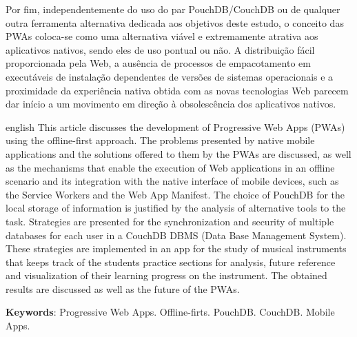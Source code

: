 \documentclass[
	article,			%
	12pt,				%
	oneside,			%
	a4paper,			%
	english,			%
	brazil,				%
	sumario=tradicional
	]{abntex2}
\begin{document}
Por fim, independentemente do uso do par PouchDB/CouchDB ou de qualquer outra ferramenta alternativa dedicada aos objetivos deste estudo, o conceito das PWAs coloca-se como uma alternativa viável e extremamente atrativa aos aplicativos nativos, sendo eles de uso pontual ou não. A distribuição fácil proporcionada pela Web, a ausência de processos de empacotamento em executáveis de instalação dependentes de versões de sistemas operacionais e a proximidade da experiência nativa obtida com as novas tecnologias Web parecem dar início a um movimento em direção à obsolescência dos aplicativos nativos.

\postextual



\emptythanks
\maketitle

\renewcommand{\resumoname}{Abstract}
\begin{resumoumacoluna}
 \begin{otherlanguage*}{english}
   This article discusses the development of Progressive Web Apps (PWAs) using
   the offline-first approach. The problems presented by native mobile applications and the solutions offered to them by the PWAs are discussed, as well as the mechanisms that enable the execution of Web applications in an offline scenario and its integration with the native interface of mobile devices, such as the Service Workers and the
   Web App Manifest. The choice of PouchDB for the local storage of information
   is justified by the analysis of alternative tools to the task. Strategies are
   presented for the synchronization and security of multiple databases for
   each user in a CouchDB DBMS (Data Base Management System). These strategies are implemented in an app for the study of musical instruments that keeps track of the students practice sections for analysis, future reference and visualization of their learning progress on the instrument. The obtained results are discussed as well as the future of the PWAs. 

   \vspace{\onelineskip}
 
   \noindent
   \textbf{Keywords}: Progressive Web Apps. Offline-firts. PouchDB. CouchDB. Mobile Apps.
 \end{otherlanguage*}  
\end{resumoumacoluna}



\end{document}
